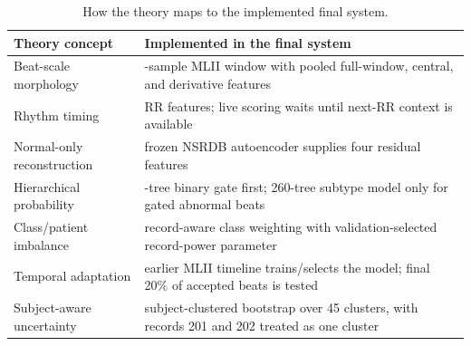 \begin{table}[H]
\centering
\caption{How the theory maps to the implemented final system.}
\label{tab:theory-system-alignment}
\begin{tabular}{>{\raggedright\arraybackslash}p{4.2cm}>{\raggedright\arraybackslash}p{9.0cm}}
\toprule
Theory concept & Implemented in the final system\\
\midrule
Beat-scale morphology & 512-sample MLII window with pooled full-window,
central, and derivative features\\
Rhythm timing & 15 RR features; live scoring waits until next-RR context is
available\\
Normal-only reconstruction & frozen NSRDB autoencoder supplies four residual
features\\
Hierarchical probability & 240-tree binary gate first; 260-tree subtype model
only for gated abnormal beats\\
Class/patient imbalance & record-aware class weighting with validation-selected
record-power parameter\\
Temporal adaptation & earlier MLII timeline trains/selects the model; final
20\% of accepted beats is tested\\
Subject-aware uncertainty & subject-clustered bootstrap over 45 clusters, with
records 201 and 202 treated as one cluster\\
\bottomrule
\end{tabular}
\end{table}
